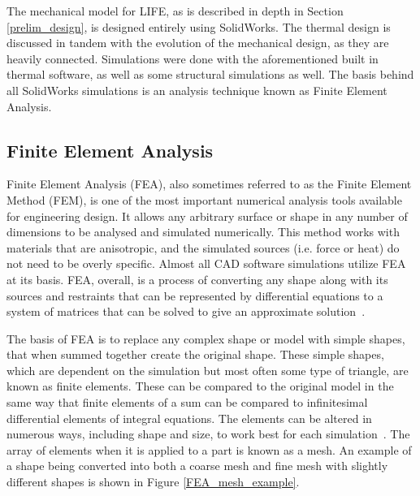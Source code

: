 The mechanical model for LIFE, as is described in depth in Section \ref{prelim_design}, is designed entirely using SolidWorks. The thermal design is discussed in tandem with the evolution of the mechanical design, as they are heavily connected. Simulations were done with the aforementioned built in thermal software, as well as some structural simulations as well. The basis behind all SolidWorks simulations is an analysis technique known as Finite Element Analysis.

\subsection{Finite Element Analysis} \label{FEA}
Finite Element Analysis (FEA), also sometimes referred to as the Finite Element Method (FEM), is one of the most important numerical analysis tools available for engineering design. It allows any arbitrary surface or shape in any number of dimensions to be analysed and simulated numerically. This method works with materials that are anisotropic, and the simulated sources (i.e. force or heat) do not need to be overly specific. Almost all CAD software simulations utilize FEA at its basis. FEA, overall, is a process of converting any shape along with its sources and restraints that can be represented by differential equations to a system of matrices that can be solved to give an approximate solution~\citep{FEA_SW}.

The basis of FEA is to replace any complex shape or model with simple shapes, that when summed together create the original shape. These simple shapes, which are dependent on the simulation but most often some type of triangle, are known as finite elements. These can be compared to the original model in the same way that finite elements of a sum can be compared to infinitesimal differential elements of integral equations. The elements can be altered in numerous ways, including shape and size, to work best for each simulation~\citep{FEA_SW}. The array of elements when it is applied to a part is known as a mesh. An example of a shape being converted into both a coarse mesh and fine mesh with slightly different shapes is shown in Figure \ref{FEA_mesh_example}.

